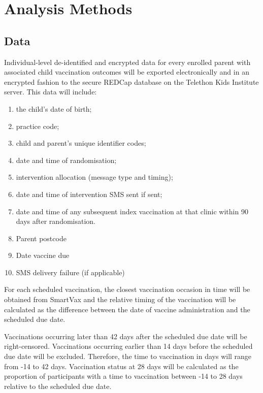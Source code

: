 \documentclass[
  bibliography=totoc]{scrreprt}
\providecommand{\tightlist}{%
  \setlength{\itemsep}{0pt}\setlength{\parskip}{0pt}}
\begin{document}
\hypertarget{analysis-methods}{%
\chapter{Analysis Methods}\label{analysis-methods}}

\hypertarget{data}{%
\section{Data}\label{data}}

Individual-level de-identified and encrypted data for every enrolled parent with associated child vaccination outcomes will be exported electronically and in an encrypted fashion to the secure REDCap database on the Telethon Kids Institute server.
This data will include:

\begin{enumerate}
\def\labelenumi{\arabic{enumi}.}
\tightlist
\item
  the child's date of birth;
\item
  practice code;
\item
  child and parent's unique identifier codes;
\item
  date and time of randomisation;
\item
  intervention allocation (message type and timing);
\item
  date and time of intervention SMS sent if sent;
\item
  date and time of any subsequent index vaccination at that clinic within 90 days after randomisation.
\item
  Parent postcode
\item
  Date vaccine due
\item
  SMS delivery failure (if applicable)
\end{enumerate}

For each scheduled vaccination, the closest vaccination occasion in time will be obtained from SmartVax and the relative timing of the vaccination will be calculated as the difference between the date of vaccine administration and the scheduled due date.

Vaccinations occurring later than 42 days after the scheduled due date will be right-censored.
Vaccinations occurring earlier than 14 days before the scheduled due date will be excluded.
Therefore, the time to vaccination in days will range from -14 to 42 days.
Vaccination status at 28 days will be calculated as the proportion of participants with a time to vaccination between -14 to 28 days relative to the scheduled due date.
\end{document}
